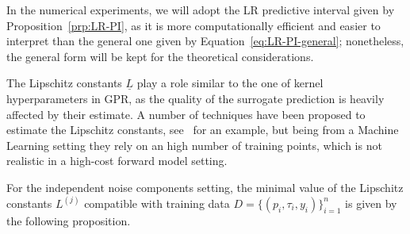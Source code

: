 In the numerical experiments, we will adopt the LR predictive interval given by Proposition~\ref{prp:LR-PI}, as it is more computationally efficient and easier to interpret than the general one given by Equation~\eqref{eq:LR-PI-general}; nonetheless, the general form will be kept for the theoretical considerations. \medbreak

The Lipschitz constants $\underline L$ play a role similar to the one of kernel hyperparameters in GPR, as the quality of the surrogate prediction is heavily affected by their estimate.
A number of techniques have been proposed to estimate the Lipschitz constants, see~\cite{Calliess2017} for an example, but being from a Machine Learning setting they rely on an high number of training points, which is not realistic in a high-cost forward model setting.

For the independent noise components setting, the minimal value of the Lipschitz constants $L^{(j)}$ compatible with training data $D=\{ (p_i, \tau_i, y_i) \}_{i=1}^n$ is given by the following proposition.

